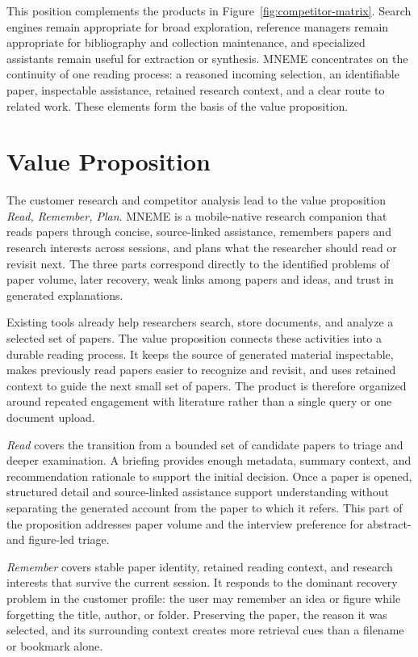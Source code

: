 This position complements the products in
Figure~\ref{fig:competitor-matrix}.
Search engines remain appropriate for broad exploration, reference managers
remain appropriate for bibliography and collection maintenance, and
specialized assistants remain useful for extraction or synthesis.  MNEME
concentrates on the continuity of one reading process: a reasoned incoming
selection, an identifiable paper, inspectable assistance, retained research
context, and a clear route to related work.  These elements form the basis of
the value proposition.

\section{Value Proposition}

The customer research and competitor analysis lead to the value proposition
\emph{Read, Remember, Plan}.  MNEME is a mobile-native research companion that
reads papers through concise, source-linked assistance, remembers papers and
research interests across sessions, and plans what the researcher should read
or revisit next.  The three parts correspond directly to the identified
problems of paper volume, later recovery, weak links among papers and ideas,
and trust in generated explanations.

Existing tools already help researchers search, store documents, and analyze a
selected set of papers.  The value proposition connects these activities into
a durable reading process.  It keeps the source of generated material
inspectable, makes previously read papers easier to recognize and revisit, and
uses retained context to guide the next small set of papers.  The product is
therefore organized around repeated engagement with literature rather than a
single query or one document upload.

\emph{Read} covers the transition from a bounded set of candidate papers to
triage and deeper examination.  A briefing provides enough metadata, summary
context, and recommendation rationale to support the initial decision.  Once a
paper is opened, structured detail and source-linked assistance support
understanding without separating the generated account from the paper to which
it refers.  This part of the proposition addresses paper volume and the
interview preference for abstract- and figure-led triage.

\emph{Remember} covers stable paper identity, retained reading context, and
research interests that survive the current session.  It responds to the
dominant recovery problem in the customer profile: the user may remember an
idea or figure while forgetting the title, author, or folder.  Preserving the
paper, the reason it was selected, and its surrounding context creates more
retrieval cues than a filename or bookmark alone.

